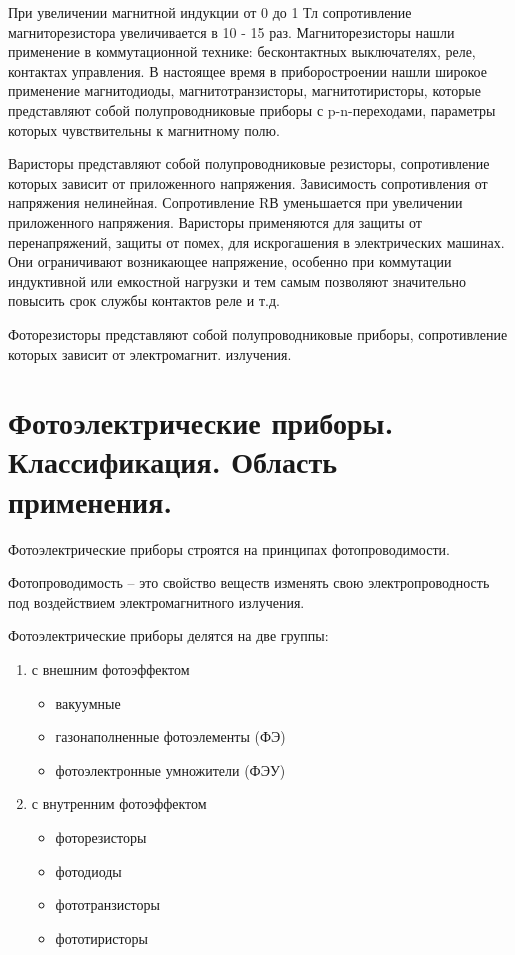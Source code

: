 \documentclass[unicode, 12pt, a4paper, oneside]{article}
\begin{document}
При увеличении магнитной индукции от 0 до 1 Тл сопротивление магниторезистора увеличивается в 10 - 15 раз. Магниторезисторы нашли применение в коммутационной технике: бесконтактных выключателях, реле, контактах управления. В настоящее время в приборостроении нашли широкое применение магнитодиоды, магнитотранзисторы, магнитотиристоры, которые представляют собой полупроводниковые приборы с p-n-переходами, параметры которых чувствительны к магнитному полю.

Варисторы представляют собой полупроводниковые резисторы, сопротивление которых зависит от приложенного напряжения. Зависимость сопротивления от напряжения нелинейная. Сопротивление RВ уменьшается при увеличении приложенного напряжения. Варисторы применяются для защиты от перенапряжений, защиты от помех, для искрогашения в электрических машинах. Они ограничивают возникающее напряжение, особенно при коммутации индуктивной или емкостной нагрузки и тем самым позволяют значительно повысить срок службы контактов реле и т.д.

Фоторезисторы представляют собой полупроводниковые приборы, сопротивление которых зависит от электромагнит. излучения.


\section{Фотоэлектрические приборы. Классификация. Область применения.}

Фотоэлектрические приборы строятся на принципах фотопроводимости.

Фотопроводимость – это свойство веществ изменять свою электропроводность под воздействием электромагнитного излучения.

Фотоэлектрические приборы делятся на две группы:
\begin{enumerate}
\item с внешним фотоэффектом
	\begin{itemize}
	\item вакуумные
	\item газонаполненные фотоэлементы (ФЭ)
	\item фотоэлектронные умножители (ФЭУ)
	\end{itemize}
\item с внутренним фотоэффектом
	\begin{itemize}
	\item фоторезисторы
	\item фотодиоды
	\item фототранзисторы
	\item фототиристоры
	\end{itemize}
\end{enumerate}
\end{document}
